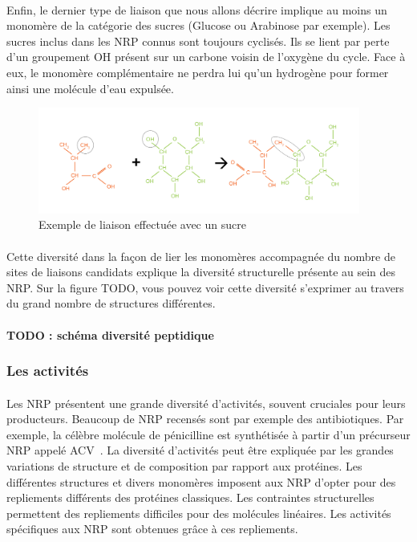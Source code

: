 \documentclass[12pt,french,twoside]{report}
\begin{document}
\paragraph{}Enfin, le dernier type de liaison que nous allons décrire implique au moins un monomère de la catégorie des sucres (Glucose ou Arabinose par exemple).
Les sucres inclus dans les NRP connus sont toujours cyclisés.
Ils se lient par perte d'un groupement OH présent sur un carbone voisin de l'oxygène du cycle.
Face à eux, le monomère complémentaire ne perdra lui qu'un hydrogène pour former ainsi une molécule d'eau expulsée.

\begin{figure}[h!]
  \begin{center}
    \includegraphics[width=400px]{Figures/bio/Intro/reactions/ose.jpg}
    \caption{\label{ose}Exemple de liaison effectuée avec un sucre}
  \end{center}
\end{figure}

\paragraph{}Cette diversité dans la façon de lier les monomères accompagnée du nombre de sites de liaisons candidats explique la diversité structurelle présente au sein des NRP.
Sur la figure TODO, vous pouvez voir cette diversité s'exprimer au travers du grand nombre de structures différentes.

\paragraph{TODO : schéma diversité peptidique}


\subsubsection{Les activités}

\paragraph{}Les NRP présentent une grande diversité d'activités, souvent cruciales pour leurs producteurs.
Beaucoup de NRP recensés sont par exemple des antibiotiques.
Par exemple, la célèbre molécule de pénicilline est synthétisée à partir d'un précurseur NRP appelé ACV~\cite{queener_molecular_1990}.
La diversité d'activités peut être expliquée par les grandes variations de structure et de composition par rapport aux protéines.
Les différentes structures et divers monomères imposent aux NRP d'opter pour des repliements différents des protéines classiques.
Les contraintes structurelles permettent des repliements difficiles pour des molécules linéaires.
Les activités spécifiques aux NRP sont obtenues grâce à ces repliements.
\end{document}

